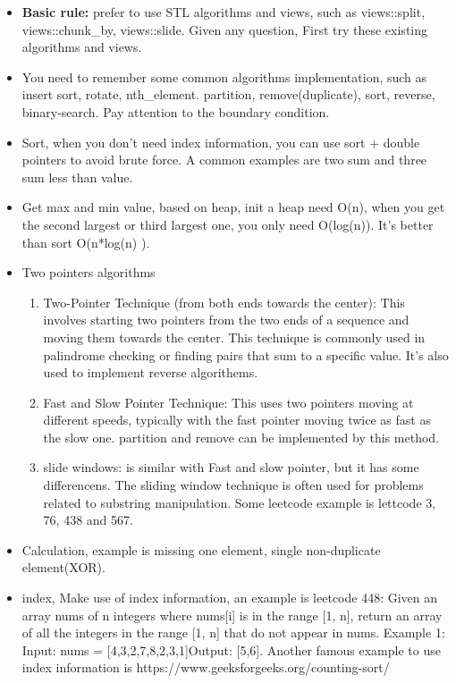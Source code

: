 \documentclass[a4paper,11pt,twoside]{book}
\begin{document}
\begin{itemize}
	\item \textbf{Basic rule:} prefer to use STL algorithms and views, such as views::split, views::chunk\_by, views::slide. Given any question, First try these existing algorithms and views.
	
	
	
	\item You need to remember some common algorithms implementation, such as insert sort, rotate, nth\_element. partition, remove(duplicate), sort, reverse, binary-search. Pay attention to the boundary condition.
	
	
	\item Sort, when you don't need index information, you can use sort + double pointers to avoid brute force. A common examples are two sum and three sum less than value. 
	
	\item Get max and min value, based on heap, init a heap need O(n), when you get the second largest or third largest one, you only need O(log(n)). It's better than sort O(n*log(n) ). 

	\item Two pointers algorithms
	\begin{enumerate}
		\item Two-Pointer Technique (from both ends towards the center): This involves starting two pointers from the two ends of a sequence and moving them towards the center. This technique is commonly used in palindrome checking or finding pairs that sum to a specific value. It's also used to implement reverse algorithems. 
		
		\item Fast and Slow Pointer Technique: This uses two pointers moving at different speeds, typically with the fast pointer moving twice as fast as the slow one. partition and remove can be implemented by this method. 
		
		\item slide windows: is similar with Fast and slow pointer, but it has some differencens. The sliding window technique is often used for problems related to substring manipulation. Some leetcode example is lettcode 3, 76, 438 and 567.
	\end{enumerate}	
	
	\item Calculation, example is missing one element, single non-duplicate element(XOR).
	
	\item index, Make use of index information, an example is leetcode 448: Given an array nums of n integers where nums[i] is in the range [1, n], return an array of all the integers in the range [1, n] that do not appear in nums. Example 1: Input: nums = [4,3,2,7,8,2,3,1]Output: [5,6]. Another famous example to use index information is  https://www.geeksforgeeks.org/counting-sort/
	

\end{itemize}
\end{document}
